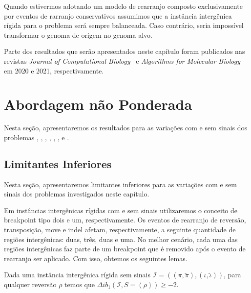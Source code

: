 

Quando estivermos adotando um modelo de rearranjo composto exclusivamente por eventos de rarranjo conservativos assumimos que a instância intergênica rígida para o problema será sempre balanceada. Caso contrário, seria impossível transformar o genoma de origem no genoma alvo.

Parte dos resultados que serão apresentados neste capítulo foram publicados nas revistas \emph{Journal of Computational Biology}~\cite{2020a-brito-etal} e \emph{Algorithms for Molecular Biology}~\cite{2021b-brito-etal} em 2020 e 2021, respectivamente.

\section{Abordagem não Ponderada}

Nesta seção, apresentaremos os resultados para as variações com e sem sinais dos problemas \SbIR{}, \SbIRI{}, \SbIRM{}, \SbIRMI{}, \SbIRT{}, \SbIRTI{}, \SbIRTM{} e \SbIRTMI{}.

\subsection{Limitantes Inferiores}

Nesta seção, apresentaremos limitantes inferiores para as variações com e sem sinais dos problemas investigados neste capítulo.

Em instâncias intergênicas rígidas com e sem sinais utilizaremos o conceito de breakpoint tipo dois e um, respectivamente. Os eventos de rearranjo de reversão, transposição, move e indel afetam, respectivamente, a seguinte quantidade de regiões intergênicas: duas, três, duas e uma. No melhor cenário, cada uma das regiões intergênicas faz parte de um breakpoint que é removido após o evento de rearranjo ser aplicado. Com isso, obtemos os seguintes lemas.

\begin{lemma}\label{lemma:KFFPUBQG}
Dada uma instância intergênica rígida sem sinais $\mathcal{I}=((\pi,\breve\pi),(\iota,\breve\iota))$, para qualquer reversão $\rho$ temos que $\Delta ib_1(\mathcal{I}, S = (\rho)) \ge -2$.
\end{lemma}

